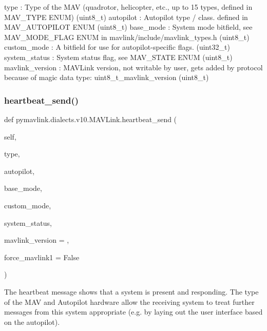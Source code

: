 \begin{DoxyVerb}
\begin{DoxyVerb}
\begin{DoxyVerb}
type                      : Type of the MAV (quadrotor, helicopter, etc., up to 15 types, defined in MAV_TYPE ENUM) (uint8_t)
autopilot                 : Autopilot type / class. defined in MAV_AUTOPILOT ENUM (uint8_t)
base_mode                 : System mode bitfield, see MAV_MODE_FLAG ENUM in mavlink/include/mavlink_types.h (uint8_t)
custom_mode               : A bitfield for use for autopilot-specific flags. (uint32_t)
system_status             : System status flag, see MAV_STATE ENUM (uint8_t)
mavlink_version           : MAVLink version, not writable by user, gets added by protocol because of magic data type: uint8_t_mavlink_version (uint8_t)\end{DoxyVerb}
 \mbox{\label{classpymavlink_1_1dialects_1_1v10_1_1MAVLink_a1ca242912a8bd37b0646d5866351bac5}} 
\subsubsection{\texorpdfstring{heartbeat\+\_\+send()}{heartbeat\_send()}}
{\footnotesize\ttfamily def pymavlink.\+dialects.\+v10.\+M\+A\+V\+Link.\+heartbeat\+\_\+send (\begin{DoxyParamCaption}\item[{}]{self,  }\item[{}]{type,  }\item[{}]{autopilot,  }\item[{}]{base\+\_\+mode,  }\item[{}]{custom\+\_\+mode,  }\item[{}]{system\+\_\+status,  }\item[{}]{mavlink\+\_\+version = {},  }\item[{}]{force\+\_\+mavlink1 = {\ttfamily False} }\end{DoxyParamCaption})}

\begin{DoxyVerb}The heartbeat message shows that a system is present and responding.
The type of the MAV and Autopilot hardware allow the
receiving system to treat further messages from this
system appropriate (e.g. by laying out the user
interface based on the autopilot).


\end{DoxyVerb}
\end{DoxyVerb}
\end{DoxyVerb}
